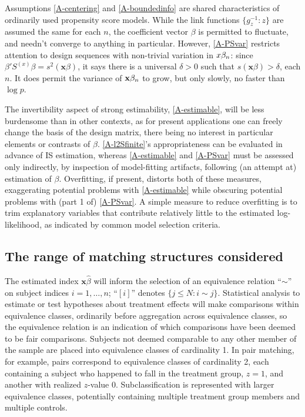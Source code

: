 \documentclass{article}
\theoremstyle{remark}
\begin{document}
Assumptions \ref{A-centering} and \ref{A-boundedinfo} are shared characteristics of ordinarily used propensity score models.  While the link functions $\{g_{z}^{-1}: z\}$ are assumed the same for each $n$, the coefficient vector $\beta$ is permitted to fluctuate, and needn't converge to anything in particular.  However, \ref{A-PSvar} restricts attention to design sequences with non-trivial variation in ${x}\beta_{n } $: since $\beta'S^{(x)}\beta = s^{2}(\mathbf{x}\beta)$, it says there is a universal $\delta>0$ such that $s(\mathbf{x}\beta)>\delta$, each $n$.   It does permit the variance of $\mathbf{x}\beta_{n }$ to grow, but only slowly, no faster than $\log p$. 

The invertibility aspect of strong estimability, \ref{A-estimable}, will be less burdensome than in other contexts, as for present applications one can freely change the basis of the design matrix, there being no interest in particular elements or contrasts of $\beta$.   
\ref{A-l2Sfinite}'s appropriateness can be evaluated in advance of IS estimation, whereas \ref{A-estimable} and \ref{A-PSvar} must be assessed only indirectly, by inspection of model-fitting artifacts, following (an attempt at) estimation of $\beta$.
Overfitting, if present, distorts both of these measures, exaggerating potential problems with \ref{A-estimable} while obscuring potential problems with (part 1 of) \ref{A-PSvar}.  A simple measure to reduce overfitting is to trim explanatory variables that contribute relatively little to the estimated log-likelihood, as indicated by common model selection criteria.

\subsection{The range of matching structures considered}

The estimated index $\mathbf{x}\hat\beta$ will inform the selection of an equivalence relation ``$\sim$'' on subject indices $i = 1, \ldots, n$; ``$[i]$'' denotes $\{j\leq N: i \sim j\}$. Statistical analysis to estimate or test hypotheses about treatment effects will make comparisons within equivalence classes, ordinarily before aggregation across equivalence classes, so the equivalence relation is an indication of which comparisons have been deemed to be fair comparisons.  Subjects not deemed comparable to any other member of the sample are placed into equivalence classes of cardinality 1.  In pair matching, for example, pairs correspond to equivalence classes of cardinality 2, each containing a subject who happened to fall in the treatment group, $z=1$, and another with realized  $z$-value 0. Subclassification is represented with larger equivalence classes, potentially containing multiple treatment group members and multiple controls. 
\end{document}
